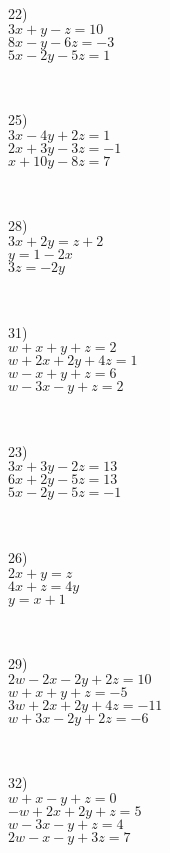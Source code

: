 \begin{multicols}{3}
 \label{matrices3}
  22)\\
  $3 x + y - z = 10$\\
  $8 x - y - 6 z = - 3$\\
  $5 x - 2 y - 5 z = 1$\par
~\par
  25)\\
  $3 x - 4 y + 2 z = 1$\\
  $2 x + 3 y - 3 z = - 1$\\
  $x + 10 y - 8 z = 7$\par
~\par
  28)\\
  $3 x + 2 y = z + 2$\\
  $y = 1 - 2 x$\\
  $3 z = - 2 y$\par
~\par  
  31)\\
  $w + x + y + z = 2$\\
  $w + 2 x + 2 y + 4 z = 1$\\
  $w - x + y + z = 6$\\
	$w - 3 x - y + z = 2$\par
~\par
  
  23)\\
  $3 x + 3 y - 2 z = 13$\\
  $6 x + 2 y - 5 z = 13$\\
  $5 x - 2 y - 5 z = - 1$\par
~\par
  26)\\
  $2 x + y = z$\\
  $4 x + z = 4 y$\\
  $y = x + 1$\par
~\par
  29)\\
  $2 w - 2 x - 2 y + 2 z = 10$\\
	$w + x + y + z = - 5$\\
	$3 w + 2 x + 2 y + 4 z = - 11$\\
	$w + 3 x - 2 y + 2 z = - 6$\par
~\par
  32)\\
  $w + x - y + z = 0$\\
  $- w + 2 x + 2 y + z = 5$\\
	$w - 3 x - y + z = 4$\\
	$2 w - x - y + 3 z = 7$\par
  

\end{multicols}
